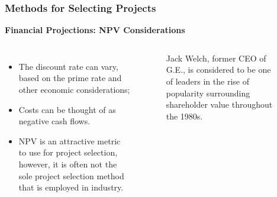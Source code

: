 \documentclass[aspectratio=169]{beamer}
\begin{document}
\begin{frame}
\frametitle{Methods for Selecting Projects}
\textbf{Financial Projections: NPV Considerations}\\
\vspace{0.5cm}
\begin{columns}
\begin{itemize}
\item The discount rate can vary, based on the prime rate and other economic considerations;
\item Costs can be thought of as negative cash flows.
\item NPV is an attractive metric to use for project selection, however, it is often not the sole project selection method that is employed in industry.
\end{itemize}
\begin{figure}
\caption{Jack Welch, former CEO of G.E., is considered to be one of leaders in the rise of popularity surrounding shareholder value throughout the 1980s.}
\end{figure}
\end{columns}
\end{frame}
\end{document}
